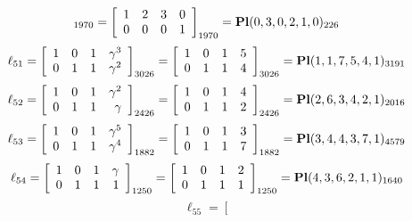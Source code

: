 \documentclass{article}
\begin{document}
{$$_{1970}
=
\left[
\begin{array}{*{4}c}
1  & 2  & 3  & 0\\
0  & 0  & 0  & 1\\
\end{array}
\right]_{1970}
={\rm\bf Pl}(0,3,0,2,1,0 )_{226}$$
$$
\ell_{51} = 
\left[
\begin{array}{*{4}{r}}
1 & 0 & 1 & \gamma^{3}\\
0 & 1 & 1 & \gamma^{2}\\
\end{array}
\right]
_{3026}
=
\left[
\begin{array}{*{4}c}
1  & 0  & 1  & 5\\
0  & 1  & 1  & 4\\
\end{array}
\right]_{3026}
={\rm\bf Pl}(1,1,7,5,4,1 )_{3191}$$
$$
\ell_{52} = 
\left[
\begin{array}{*{4}{r}}
1 & 0 & 1 & \gamma^{2}\\
0 & 1 & 1 & \gamma \\
\end{array}
\right]
_{2426}
=
\left[
\begin{array}{*{4}c}
1  & 0  & 1  & 4\\
0  & 1  & 1  & 2\\
\end{array}
\right]_{2426}
={\rm\bf Pl}(2,6,3,4,2,1 )_{2016}$$
$$
\ell_{53} = 
\left[
\begin{array}{*{4}{r}}
1 & 0 & 1 & \gamma^{5}\\
0 & 1 & 1 & \gamma^{4}\\
\end{array}
\right]
_{1882}
=
\left[
\begin{array}{*{4}c}
1  & 0  & 1  & 3\\
0  & 1  & 1  & 7\\
\end{array}
\right]_{1882}
={\rm\bf Pl}(3,4,4,3,7,1 )_{4579}$$
$$
\ell_{54} = 
\left[
\begin{array}{*{4}{r}}
1 & 0 & 1 & \gamma \\
0 & 1 & 1 & 1\\
\end{array}
\right]
_{1250}
=
\left[
\begin{array}{*{4}c}
1  & 0  & 1  & 2\\
0  & 1  & 1  & 1\\
\end{array}
\right]_{1250}
={\rm\bf Pl}(4,3,6,2,1,1 )_{1640}$$
$$
\ell_{55} = 
\left[
$$}
\end{document}
